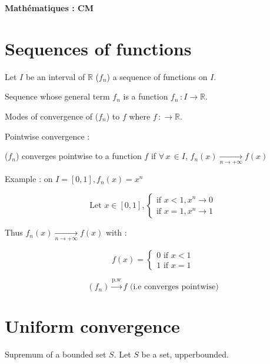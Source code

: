 \documentclass[a4paper,12pt]{article}
\begin{document}
\begin{center}
\begin{center}
    \huge{\textbf{Mathématiques : CM}}
\end{center}
\end{center}
\newpage

\tableofcontents 


\newpage



\section{Sequences of functions}

Let $I$ be an interval of $\mathbb{R}$ ($f_n$) a sequence of functions on $I$. \newline

Sequence whose general term $f_n$ is a function $f_n \, : I \rightarrow \mathbb{R}$. \newline

Modes of convergence of ($f_n$) to $f$ where $f \, : \rightarrow \mathbb{R}$. \newline

Pointwise convergence :

($f_n$) converges pointwise to a function $f$ if  $\forall \, x \, \in I$, $f_n(x) \underset{n \rightarrow +\infty}{\rightarrow} f(x)$

Example : on $I = [0, 1], f_n(x) = x^n$

\[
\text{Let } x\in [0,1], \begin{cases}
    \text{if } x < 1, x^n \rightarrow 0 \\
    \text{if } x = 1, x^n \rightarrow 1
\end{cases}
\]

Thus $f_n(x) \underset{n \rightarrow +\infty}{\rightarrow} f(x)$ with :

\[
f(x) = \begin{cases}
    0 \text{ if } x < 1 \\
    1 \text{ if } x = 1
\end{cases}
\]

\[(f_n) \overset{\text{p.w}}{\rightarrow} f \text{ (i.e converges pointwise)} \]

\section{Uniform convergence}

Supremum of a bounded set $S$. \newline
Let $S$ be a set, upperbounded. \newline
\end{document}
